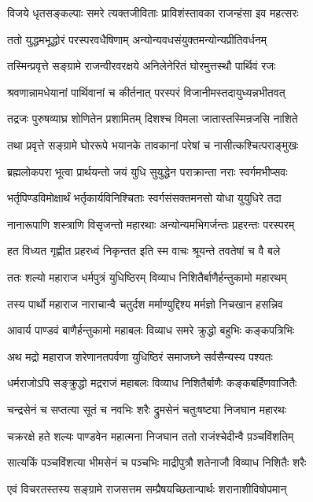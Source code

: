 \twolineshloka
{विजये धृतसङ्कल्पाः समरे त्यक्तजीविताः}
{प्राविशंस्तावका राजन्हंसा इव महत्सरः}


\twolineshloka
{ततो युद्धमभूद्धोरं परस्परवधैषिणाम्}
{अन्योन्यवधसंयुक्तमन्योन्यप्रीतिवर्धनम्}


\twolineshloka
{तस्मिन्प्रवृत्ते सङ्ग्रामे राजन्वीरवरक्षये}
{अनिलेनेरितं घोरमुत्तस्थौ पार्थिवं रजः}


\twolineshloka
{श्रवणान्नामधेयानां पार्थिवानां च कीर्तनात्}
{परस्परं विजानीमस्तदायुध्यन्नभीतवत्}


\twolineshloka
{तद्रजः पुरुषव्याघ्र शोणितेन प्रशामितम्}
{दिशश्च विमला जातास्तस्मिन्रजसि नाशिते}


\twolineshloka
{तथा प्रवृत्ते सङ्ग्रामे घोररूपे भयानके}
{तावकानां परेषां च नासीत्कश्चित्पराङ्मुखः}


\twolineshloka
{ब्रह्मलोकपरा भूत्वा प्रार्थयन्तो जयं युधि}
{सुयुद्धेन पराक्रान्ता नराः स्वर्गमभीप्सवः}


\twolineshloka
{भर्तृपिण्डविमोक्षार्थं भर्तृकार्यविनिश्चिताः}
{स्वर्गसंसक्तमनसो योधा युयुधिरे तदा}


\twolineshloka
{नानारूपाणि शस्त्राणि विसृजन्तो महारथाः}
{अन्योन्यमभिगर्जन्तः प्रहरन्तः परस्परम्}


\twolineshloka
{हत विध्यत गृह्णीत प्रहरध्वं निकृन्तत}
{इति स्म वाचः श्रूयन्ते तवतेषां च वै बले}


\twolineshloka
{ततः शल्यो महाराज धर्मपुत्रं युधिष्ठिरम्}
{विव्याध निशितैर्बाणैर्हन्तुकामो महारथम्}


\twolineshloka
{तस्य पार्थो महाराज नाराचान्वै चतुर्दश}
{मर्माण्युद्दिश्य मर्मज्ञो निचखान हसन्निव}


\twolineshloka
{आवार्य पाण्डवं बाणैर्हन्तुकामो महाबलः}
{विव्याध समरे क्रुद्धो बहुभिः कङ्कपत्रिभिः}


\twolineshloka
{अथ मद्रो महाराज शरेणानतपर्वणा}
{युधिष्ठिरं समाजघ्ने सर्वसैन्यस्य पश्यतः}


\twolineshloka
{धर्मराजोऽपि सङ्क्रुद्धो मद्रराजं महाबलः}
{विव्याध निशितैर्बाणैः कङ्कबर्हिणवाजितैः}


\twolineshloka
{चन्द्रसेनं च सप्तत्या सूतं च नवभिः शरैः}
{द्रुमसेनं चतुःषष्ट्या निजघान महारथः}


\twolineshloka
{चक्ररक्षे हते शल्यः पाण्डवेन महात्मना}
{निजघान ततो राजंश्चेदीन्वै प़ञ्चविंशतिम्}


\twolineshloka
{सात्यकिं पञ्चविंशत्या भीमसेनं च पञ्चभिः}
{माद्रीपुत्रौ शतेनाजौ विव्याध निशितैः शरैः}


\twolineshloka
{एवं विचरतस्तस्य सङ्ग्रामे राजसत्तम}
{सम्प्रैषयच्छितान्पार्थः शरानाशीविषोपमान्}


